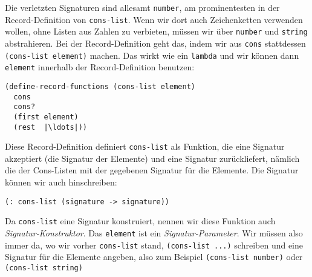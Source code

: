 Die verletzten Signaturen sind allesamt \lstinline{number}, am
prominentesten in der Record-Definition von \lstinline{cons-list}.
Wenn wir dort auch Zeichenketten verwenden wollen, ohne Listen aus
Zahlen zu verbieten, müssen wir über
\lstinline{number} und \lstinline{string} abstrahieren.  Bei der
Record-Definition geht das, indem wir aus \lstinline{cons} stattdessen
\lstinline{(cons-list element)} machen.
Das wirkt wie ein
\lstinline{lambda} und wir können dann \lstinline{element} innerhalb
der Record-Definition benutzen:
%
\begin{lstlisting}
(define-record-functions (cons-list element)
  cons
  cons?
  (first element)
  (rest  |\ldots|))
\end{lstlisting}
%
Diese Record-Definition definiert \lstinline{cons-list} als Funktion,
die eine Signatur akzeptiert (die Signatur der Elemente) und eine
Signatur zurückliefert, nämlich die der Cons-Listen mit der gegebenen
Signatur für die Elemente.  Die Signatur können wir auch hinschreiben:
%
\begin{lstlisting}
(: cons-list (signature -> signature))
\end{lstlisting}
%
Da \lstinline{cons-list} eine Signatur konstruiert, nennen wir diese
Funktion auch \textit{Signatur-Konstruktor}.
Das \lstinline{element} ist ein \textit{Signatur-Parameter}.
Wir müssen also immer da, wo wir vorher \lstinline{cons-list} stand,
\lstinline{(cons-list ...)} schreiben und eine Signatur für die
Elemente angeben, also zum Beispiel \lstinline{(cons-list number)}
oder \lstinline{(cons-list string)}

